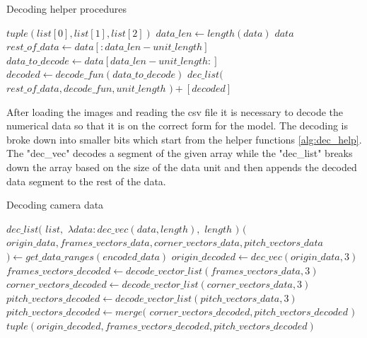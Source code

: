 \documentclass[
    11pt,
    oneside
]{report}
\begin{document}
\begin{algorithm}[H]
\begin{algorithmic}
\caption{Decoding helper procedures}\label{alg:dec_help}
    \Return $tuple(list[0], list[1], list[2])$
\EndProcedure
{}
    \State
    $data\_len \gets length(data)$
        \Return $data$
    \EndIf
    \State $rest\_of\_data \gets data[:data\_len - unit\_length]$
    \State $data\_to\_decode \gets data[data\_len - unit\_length:]$
    \State $decoded \gets decode\_fun(data\_to\_decode)$
    \State
    \Return $dec\_list($
            \State \indent $rest\_of\_data,decode\_fun,unit\_length$
    \State $) + [decoded]$
\EndProcedure
\end{algorithmic}
\end{algorithm}


After loading the images and reading the csv file it is necessary to decode the numerical data so that it is on the correct form for the model. The decoding is broke down into smaller bits which start from the helper functions \ref{alg:dec_help}. The "dec\_vec" decodes a segment of the given array while the "dec\_list" breaks down the array based on the size of the data unit and then appends the decoded data segment to the rest of the data.





\begin{algorithm}[H]
\begin{algorithmic}
\caption{Decoding camera data}\label{alg:dec_data}
    \Return $dec\_list($
        \State \indent $list,$
        \State \indent $\lambda data: dec\_vec(data, length),$
        \State \indent $length$
    \State $)$
\EndProcedure
{}
    \State $($
    \State \indent $origin\_data, frames\_vectors\_data, corner\_vectors\_data, pitch\_vectors\_data$
    \State $) \gets get\_data\_ranges(encoded\_data)$
    \State $origin\_decoded \gets dec\_vec(origin\_data, 3)$
    \State $frames\_vectors\_decoded \gets decode\_vector\_list(frames\_vectors\_data, 3)$
    \State $corner\_vectors\_decoded \gets decode\_vector\_list(corner\_vectors\_data, 3)$
    \State $pitch\_vectors\_decoded \gets decode\_vector\_list(pitch\_vectors\_data, 3)$
    \State $pitch\_vectors\_decoded \gets merge($
        \State \indent $corner\_vectors\_decoded, pitch\_vectors\_decoded$
    \State $)$
    \State
    \Return $tuple(origin\_decoded, frames\_vectors\_decoded, pitch\_vectors\_decoded)$
\EndProcedure
\end{algorithmic}
\end{algorithm}
\end{document}
